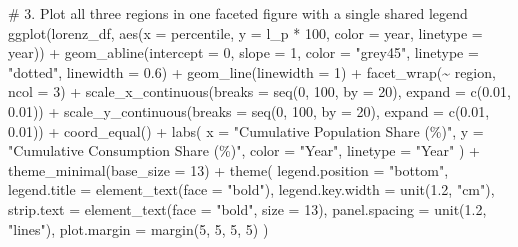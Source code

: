 \documentclass[
  letterpaper,
  DIV=11,
  numbers=noendperiod]{scrartcl}
\newenvironment{Shaded}{\begin{snugshade}}{\end{snugshade}}
\newcommand{\AttributeTok}[1]{\textcolor[rgb]{0.40,0.45,0.13}{#1}}
\newcommand{\CommentTok}[1]{\textcolor[rgb]{0.37,0.37,0.37}{#1}}
\newcommand{\DecValTok}[1]{\textcolor[rgb]{0.68,0.00,0.00}{#1}}
\newcommand{\FloatTok}[1]{\textcolor[rgb]{0.68,0.00,0.00}{#1}}
\newcommand{\FunctionTok}[1]{\textcolor[rgb]{0.28,0.35,0.67}{#1}}
\newcommand{\NormalTok}[1]{\textcolor[rgb]{0.00,0.23,0.31}{#1}}
\newcommand{\SpecialCharTok}[1]{\textcolor[rgb]{0.37,0.37,0.37}{#1}}
\newcommand{\StringTok}[1]{\textcolor[rgb]{0.13,0.47,0.30}{#1}}
\begin{document}
\begin{Shaded}
\begin{Highlighting}[]
\CommentTok{\# 3. Plot all three regions in one faceted figure with a single shared legend}
\FunctionTok{ggplot}\NormalTok{(lorenz\_df, }\FunctionTok{aes}\NormalTok{(}\AttributeTok{x =}\NormalTok{ percentile, }\AttributeTok{y =}\NormalTok{ l\_p }\SpecialCharTok{*} \DecValTok{100}\NormalTok{, }\AttributeTok{color =}\NormalTok{ year, }\AttributeTok{linetype =}\NormalTok{ year)) }\SpecialCharTok{+}
  \FunctionTok{geom\_abline}\NormalTok{(}\AttributeTok{intercept =} \DecValTok{0}\NormalTok{, }\AttributeTok{slope =} \DecValTok{1}\NormalTok{, }\AttributeTok{color =} \StringTok{"grey45"}\NormalTok{, }\AttributeTok{linetype =} \StringTok{"dotted"}\NormalTok{, }\AttributeTok{linewidth =} \FloatTok{0.6}\NormalTok{) }\SpecialCharTok{+}
  \FunctionTok{geom\_line}\NormalTok{(}\AttributeTok{linewidth =} \DecValTok{1}\NormalTok{) }\SpecialCharTok{+}
  \FunctionTok{facet\_wrap}\NormalTok{(}\SpecialCharTok{\textasciitilde{}}\NormalTok{ region, }\AttributeTok{ncol =} \DecValTok{3}\NormalTok{) }\SpecialCharTok{+}
  \FunctionTok{scale\_x\_continuous}\NormalTok{(}\AttributeTok{breaks =} \FunctionTok{seq}\NormalTok{(}\DecValTok{0}\NormalTok{, }\DecValTok{100}\NormalTok{, }\AttributeTok{by =} \DecValTok{20}\NormalTok{), }\AttributeTok{expand =} \FunctionTok{c}\NormalTok{(}\FloatTok{0.01}\NormalTok{, }\FloatTok{0.01}\NormalTok{)) }\SpecialCharTok{+}
  \FunctionTok{scale\_y\_continuous}\NormalTok{(}\AttributeTok{breaks =} \FunctionTok{seq}\NormalTok{(}\DecValTok{0}\NormalTok{, }\DecValTok{100}\NormalTok{, }\AttributeTok{by =} \DecValTok{20}\NormalTok{), }\AttributeTok{expand =} \FunctionTok{c}\NormalTok{(}\FloatTok{0.01}\NormalTok{, }\FloatTok{0.01}\NormalTok{)) }\SpecialCharTok{+}
  \FunctionTok{coord\_equal}\NormalTok{() }\SpecialCharTok{+}
  \FunctionTok{labs}\NormalTok{(}
    \AttributeTok{x        =} \StringTok{"Cumulative Population Share (\%)"}\NormalTok{,}
    \AttributeTok{y        =} \StringTok{"Cumulative Consumption Share (\%)"}\NormalTok{,}
    \AttributeTok{color    =} \StringTok{"Year"}\NormalTok{,}
    \AttributeTok{linetype =} \StringTok{"Year"}
\NormalTok{  ) }\SpecialCharTok{+}
  \FunctionTok{theme\_minimal}\NormalTok{(}\AttributeTok{base\_size =} \DecValTok{13}\NormalTok{) }\SpecialCharTok{+}
  \FunctionTok{theme}\NormalTok{(}
    \AttributeTok{legend.position  =} \StringTok{"bottom"}\NormalTok{,}
    \AttributeTok{legend.title     =} \FunctionTok{element\_text}\NormalTok{(}\AttributeTok{face =} \StringTok{"bold"}\NormalTok{),}
    \AttributeTok{legend.key.width =} \FunctionTok{unit}\NormalTok{(}\FloatTok{1.2}\NormalTok{, }\StringTok{"cm"}\NormalTok{),}
    \AttributeTok{strip.text       =} \FunctionTok{element\_text}\NormalTok{(}\AttributeTok{face =} \StringTok{"bold"}\NormalTok{, }\AttributeTok{size =} \DecValTok{13}\NormalTok{),}
    \AttributeTok{panel.spacing    =} \FunctionTok{unit}\NormalTok{(}\FloatTok{1.2}\NormalTok{, }\StringTok{"lines"}\NormalTok{),}
    \AttributeTok{plot.margin      =} \FunctionTok{margin}\NormalTok{(}\DecValTok{5}\NormalTok{, }\DecValTok{5}\NormalTok{, }\DecValTok{5}\NormalTok{, }\DecValTok{5}\NormalTok{)}
\NormalTok{  )}
\end{Highlighting}
\end{Shaded}
\end{document}
